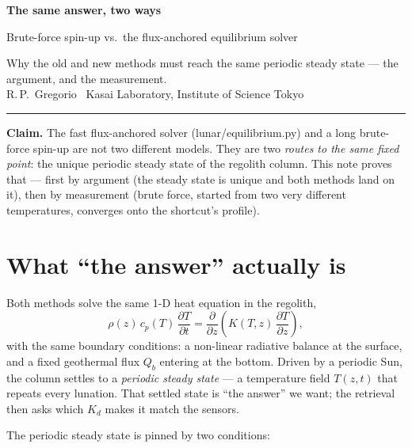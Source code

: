 \documentclass[11pt]{article}
\newcommand{\code}[1]{{\ttfamily\small #1}}
\begin{document}
\begin{center}
{\sffamily\bfseries\LARGE\color{forest} The same answer, two ways\par}
\vspace{2mm}
{\sffamily\large Brute-force spin-up vs.\ the flux-anchored equilibrium solver\par}
\vspace{2mm}
{\color{dim} Why the old and new methods must reach the same periodic steady
state --- the argument, and the measurement.\\
R.\,P.\ Gregorio \textperiodcentered\ Kasai Laboratory, Institute of Science Tokyo}
\end{center}
\vspace{2mm}
\hrule
\vspace{4mm}

\noindent
\textbf{Claim.} The fast flux-anchored solver (\code{lunar/equilibrium.py})
and a long brute-force spin-up are not two different models. They are two
\emph{routes to the same fixed point}: the unique periodic steady state of
the regolith column. This note proves that --- first by argument (the steady
state is unique and both methods land on it), then by measurement (brute
force, started from two very different temperatures, converges onto the
shortcut's profile).

\section{What ``the answer'' actually is}

Both methods solve the same 1-D heat equation in the regolith,
\begin{equation}
\rho(z)\,c_p(T)\,\frac{\partial T}{\partial t}
   = \frac{\partial}{\partial z}\!\left(K(T,z)\,\frac{\partial T}{\partial z}\right),
\label{eq:heat}
\end{equation}
with the same boundary conditions: a non-linear radiative balance at the
surface, and a fixed geothermal flux $Q_b$ entering at the bottom. Driven by
a periodic Sun, the column settles to a \emph{periodic steady state} ---
a temperature field $T(z,t)$ that repeats every lunation. That settled state
is ``the answer'' we want; the retrieval then asks which $K_d$ makes it match
the sensors.

The periodic steady state is pinned by two conditions:
\end{document}
